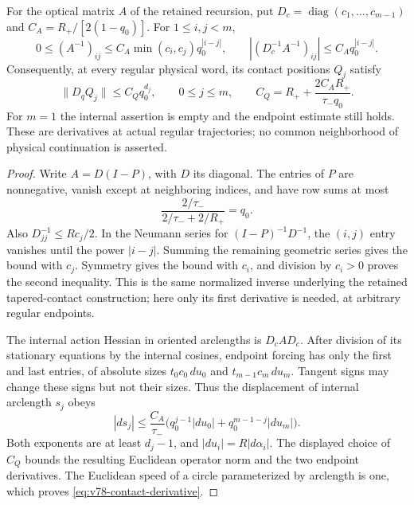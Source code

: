\begin{lemma}
\label{lem:v78-inverse}
For the optical matrix $A$ of the retained recursion, put
$D_c=\operatorname{diag}(c_1,\ldots,c_{m-1})$ and
$C_A=R_+/[2(1-q_0)]$. For $1\le i,j<m$,
\begin{equation}\label{eq:v78-inverse}
 0\le(A^{-1})_{ij}\le C_A\min(c_i,c_j)q_0^{|i-j|},
 \qquad |(D_c^{-1}A^{-1})_{ij}|\le C_Aq_0^{|i-j|}.
\end{equation}
Consequently, at every regular physical word, its contact positions
$Q_j$ satisfy
\begin{equation}\label{eq:v78-contact-derivative}
 \|D_qQ_j\|\le C_Qq_0^{d_j},\qquad 0\le j\le m,
 \qquad C_Q=R_++\frac{2C_AR_+}{\tau_-q_0}.
\end{equation}
For $m=1$ the internal assertion is empty and the endpoint estimate
still holds. These are derivatives at actual regular trajectories;
no common neighborhood of physical continuation is asserted.
\end{lemma}
\begin{proof}
Write $A=D(I-P)$, with $D$ its diagonal. The entries of $P$ are
nonnegative, vanish except at neighboring indices, and have row sums
at most
\[
 \frac{2/\tau_-}{2/\tau_-+2/R_+}=q_0.
\]
Also $D_{jj}^{-1}\le Rc_j/2$. In the Neumann series for
$(I-P)^{-1}D^{-1}$, the $(i,j)$ entry vanishes until the power
$|i-j|$. Summing the remaining geometric series gives the bound
with $c_j$. Symmetry gives the bound with $c_i$, and division by
$c_i>0$ proves the second inequality. This is the same normalized
inverse underlying the retained tapered-contact construction; here
only its first derivative is needed, at arbitrary regular endpoints.

The internal action Hessian in oriented arclengths is $D_cAD_c$.
After division of its stationary equations by the internal cosines,
endpoint forcing has only the first and last entries, of absolute
sizes $t_0c_0\,du_0$ and $t_{m-1}c_m\,du_m$. Tangent signs may
change these signs but not their sizes. Thus the displacement of
internal arclength $s_j$ obeys
\[
 |ds_j|\le\frac{C_A}{\tau_-}
     \bigl(q_0^{j-1}|du_0|+q_0^{m-1-j}|du_m|\bigr).
\]
Both exponents are at least $d_j-1$, and
$|du_i|=R|d\alpha_i|$. The displayed choice of $C_Q$ bounds the
resulting Euclidean operator norm and the two endpoint derivatives.
The Euclidean speed of a circle parameterized by arclength is one,
which proves \eqref{eq:v78-contact-derivative}.
\end{proof}

